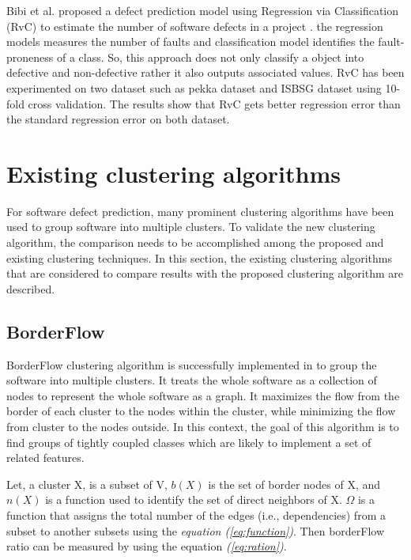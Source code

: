 \documentclass[12pt]{report}
\begin{document}
Bibi et al. proposed a defect prediction model using Regression via Classification (RvC) to estimate the number of software defects in a project \cite{bibi2006software,bibi2008regression}. the regression models measures the number of faults and classification model identifies the fault-proneness of a class. So, this approach does not only classify a object into defective and non-defective rather it also outputs associated values. RvC has been experimented on two dataset such as pekka dataset and ISBSG dataset \cite{isbsg} using 10-fold cross validation. The results show that RvC gets better regression error than the standard regression error on both dataset.    


\section{Existing clustering algorithms}

For software defect prediction, many prominent clustering algorithms have been used to group software into multiple clusters. To validate the new clustering algorithm, the comparison needs to be accomplished among the proposed and existing clustering techniques. In this section, the existing clustering algorithms that are considered to compare results with the proposed clustering algorithm are described.

\subsection{BorderFlow}
BorderFlow clustering algorithm is successfully implemented in \cite{scanniello2011clustering,scanniello2013class} to group the software into multiple clusters. It treats the whole software as a collection of nodes to represent the whole software as a graph. It maximizes the flow from the border of each cluster to the nodes within the cluster, while minimizing the flow from cluster to the nodes outside.  In this context, the goal of this algorithm is to find groups of tightly coupled classes which are likely to implement a set of related features.

Let, a cluster X, is a subset of V, $b(X)$ is the set of border nodes of X, and $n(X)$ is a function used to identify the set of direct neighbors of X. $\Omega$ is a function that assigns the total number of the edges (i.e., dependencies) from a subset to another subsets using the \emph{equation (\ref{eq:function})}. Then borderFlow ratio can be measured by using the equation \emph{(\ref{eq:ration})}.
\end{document}
